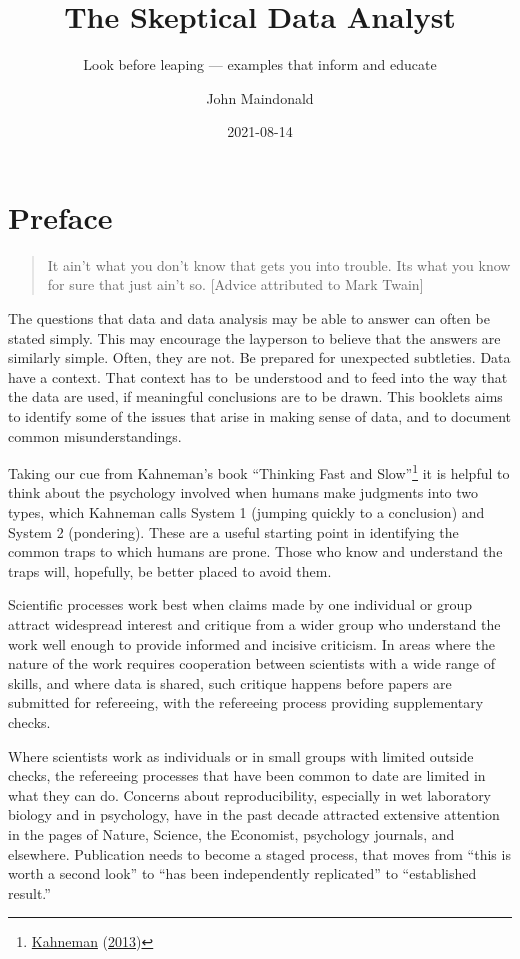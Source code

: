 \documentclass[
  10pt,
  b5paper]{book}
\title{The Skeptical Data Analyst}
\subtitle{Look before leaping --- examples that inform and educate}
\author{John Maindonald}
\date{2021-08-14}
\begin{document}
\maketitle

{
\hypersetup{linkcolor=}
\setcounter{tocdepth}{1}
\tableofcontents
}
\renewcommand{\bibname}{References}

\hypertarget{preface}{%
\chapter*{Preface}\label{preface}}

\begin{quote}
It ain't what you don't know that gets you into trouble.
Its what you know for sure that just ain't so.
{[}Advice attributed to Mark Twain{]}
\end{quote}

The questions that data and data analysis may be able to answer can
often be stated simply. This may encourage the layperson to believe
that the answers are similarly simple. Often, they are not. Be
prepared for unexpected subtleties. Data have a context. That context
has to~be understood and to feed into the way that the data are used,
if meaningful conclusions are to be drawn. This booklets aims to
identify some of the issues that arise in making sense of data,
and to document common misunderstandings.

Taking our cue from Kahneman's book ``Thinking Fast and Slow''\footnote{\protect\hyperlink{ref-kahneman_2013}{Kahneman} (\protect\hyperlink{ref-kahneman_2013}{2013})}
it is helpful to think about the psychology involved when
humans make judgments into two types, which Kahneman calls System 1
(jumping quickly to a conclusion) and System 2 (pondering).
These are a useful starting point in identifying the common traps
to which humans are prone. Those who know and understand the traps
will, hopefully, be better placed to avoid them.

Scientific processes work best when claims made by one individual
or group attract widespread interest and critique from a wider group
who understand the work well enough to provide informed and incisive
criticism. In areas where the nature of the work requires
cooperation between scientists with a wide range of skills, and
where data is shared, such critique happens before papers are
submitted for refereeing, with the refereeing process providing
supplementary checks.

Where scientists work as individuals or in small groups with
limited outside checks, the refereeing processes that have been
common to date are limited in what they can do. Concerns about
reproducibility, especially in wet laboratory biology and in psychology,
have in the past decade attracted extensive attention in the pages of
Nature, Science, the Economist, psychology journals, and elsewhere.
Publication needs to become a staged process, that moves from
``this is worth a second look'' to ``has been independently replicated''
to ``established result.''
\end{document}
